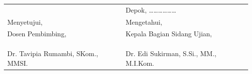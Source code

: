 \documentclass[12pt,a4paper,oneside]{book}
\begin{document}
\vspace{1.5cm}

\noindent
\begin{tabular}{@{}p{7cm} @{\hfill} p{7cm}@{}}
  & Depok, \dots\dots\dots\dots\dots\dots \\
  Menyetujui, & Mengetahui, \\
  Dosen Pembimbing, & Kepala Bagian Sidang Ujian, \\
  & \\
  & \\
  \\[2cm]
  Dr. Tavipia Rumambi, SKom., MMSI. & Dr. Edi Sukirman, S.Si., MM., M.I.Kom.
\end{tabular}

\newpage
\thispagestyle{plain}
\end{document}
